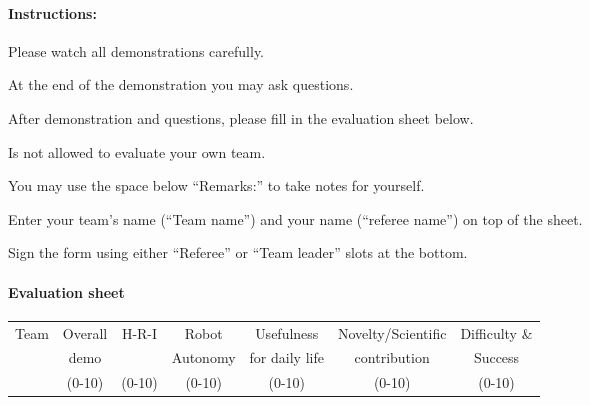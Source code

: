 \paragraph{Instructions:}
\begin{compactenum}
\item Please watch all demonstrations carefully.
\item At the end of the demonstration you may ask questions.
\item After demonstration and questions, please fill in the evaluation sheet below.
\item Is not allowed to evaluate your own team.
\item You may use the space below ``Remarks:'' to take notes for yourself.
\item Enter your team's name (``Team name'') and your name (``referee name'') on top of the sheet.
\item Sign the form using either ``Referee'' or ``Team leader'' slots at the bottom.
\end{compactenum}

\paragraph{Evaluation sheet}
\begin{center}
\begingroup
\newcommand\tableTEAMS{}
\def\do#1{\appto\tableTEAMS{#1 & & & & & &  \\\hline}}%
\expandafter\docsvlist\expandafter{\TEAMSSTAGETWO}
\begin{tabular}{|l|c|c|c|c|c|c|}
  \hline
  \multirow{3}{*}{Team}
  &  Overall &  H-R-I  &  Robot    &  Usefulness    & Novelty/Scientific         & Difficulty \&  \\
  &  demo &    &  Autonomy &  for daily life    & contribution        & Success  \\
  &  (0-10)  &  (0-10) &  (0-10)   & (0-10) & (0-10) & (0-10) \\
  \hline
  \hline
  \tableTEAMS
\end{tabular}
\endgroup
\end{center}

